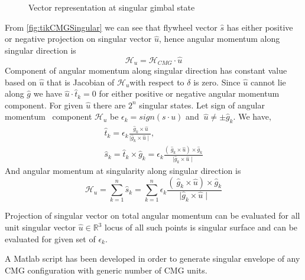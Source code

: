\begin{figure}[!h]
    \centering
    
    \caption{Vector representation at singular gimbal state}
    \label{fig:tikCMGSingular}
\end{figure}

From \autoref{fig:tikCMGSingular} we can see that flywheel vector $\displaystyle \hat{s}$ has either positive or negative projection on singular vector $\displaystyle \hat{u}$, hence angular momentum along singular direction is
\begin{equation*}
\mathcal{H}_{u} =\mathcal{H}_{CMG} \cdotp \hat{u}
\end{equation*}
Component of angular momentum along singular direction has constant value based on $\displaystyle \hat{u}$ that is Jacobian of $\displaystyle \mathcal{H}_{u}$with respect to $\displaystyle \delta $ is zero. Since $\displaystyle \hat{u}$ cannot lie along $\displaystyle \hat{g}$ we have $\displaystyle \hat{u} \cdotp \hat{t}_{k} =0$ for either positive or negative angular momentum component. For given $\displaystyle \hat{u}$ there are $\displaystyle 2^{n}$ singular states. Let sign of angular momentum \ component $\displaystyle \mathcal{H}_{u}$ be $\displaystyle \epsilon _{k} =sign( s\cdotp u)$ and $\displaystyle \ \hat{u} \neq \pm \hat{g}_{k}$. We have,
\begin{gather}
\hat{t}_{k} =\epsilon _{k}\frac{\ \hat{g}_{k} \times \hat{u}}{\mid \hat{g}_{k} \times \hat{u} \mid } ,\\
\hat{s}_{k} =\hat{t}_{k} \times \hat{g}_{k} =\epsilon _{k}\frac{( \ \hat{g}_{k} \times \hat{u}) \times \hat{g}_{k}}{\mid \hat{g}_{k} \times \hat{u} \mid }
\end{gather}
And angular momentum at singularity along singular direction is 
\begin{equation}
\mathcal{H}_{u} =\sum ^{n}_{k=1}\hat{s}_{k} =\sum ^{n}_{k=1} \epsilon _{k}\frac{( \ \hat{g}_{k} \times \hat{u}) \times \hat{g}_{k}}{\mid \hat{g}_{k} \times \hat{u} \mid }
\end{equation}


Projection of singular vector on total angular momentum can be evaluated for all unit singular vector $\displaystyle \hat{u} \in \mathbb{R}^{3}$ locus of all such points is singular surface and can be evaluated for given set of $\epsilon_k$. \cite{YoonSingularity}

A Matlab script has been developed in order to generate singular envelope of any CMG configuration with generic number of CMG units.

